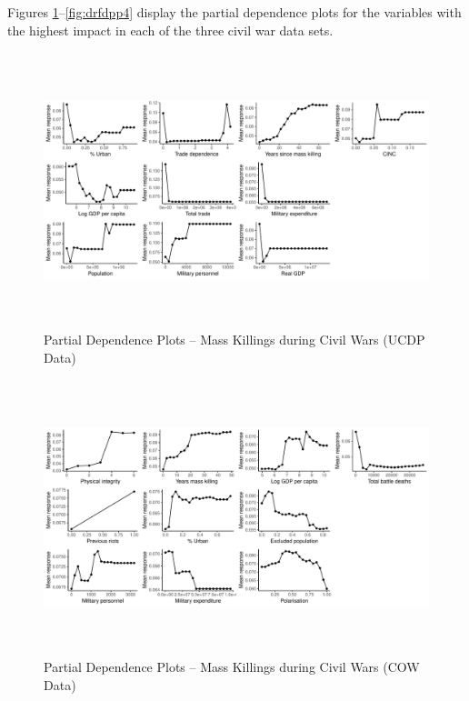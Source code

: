 \documentclass[a4paper,12pt]{article}
\begin{document}
Figures \ref{fig:drfdpp2}--\ref{fig:drfdpp4} display the partial dependence plots for the variables with the highest impact in each of the three civil war data sets.

\vspace{1cm}
	
\begin{figure}[H]
    \centering
    \includegraphics[width=\textwidth, height=8cm]{images/rf-ucdp-pd.pdf}
    \caption{Partial Dependence Plots -- Mass Killings during Civil Wars (UCDP Data)}
    \label{fig:drfdpp2}
\end{figure}
	
\begin{figure}[H]
    \begin{center}
    \includegraphics[width=\textwidth, height=8cm]{images/rf-cow-pd.pdf}
    \caption{Partial Dependence Plots -- Mass Killings during Civil Wars (COW Data)}
    \label{fig:drfdpp3}
    \end{center}
\end{figure}	
	
\end{document}
